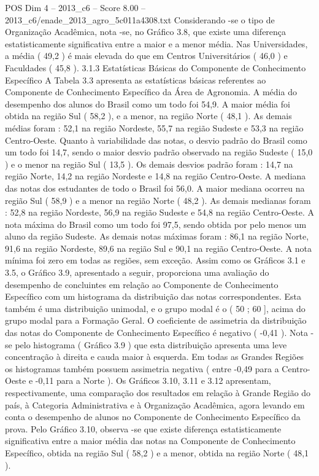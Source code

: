 \begin{textsample}{POS Dim 4 – 2013\_c6 – Score 8.00 – 2013\_c6/enade\_2013\_agro\_5c011a4308.txt}
Considerando -se o tipo de Organização Acadêmica, nota -se, no Gráfico 3.8, que existe uma diferença estatisticamente significativa entre a maior e a menor média.
Nas Universidades, a média ( 49,2 ) é mais elevada do que em Centros Universitários ( 46,0 ) e Faculdades ( 45,8 ). 3.1.3 Estatísticas Básicas do Componente de Conhecimento Específico A Tabela 3.3 apresenta as estatísticas básicas referentes ao Componente de Conhecimento Específico da Área de Agronomia.
A média do desempenho dos alunos do Brasil como um todo foi 54,9.
A maior média foi obtida na região Sul ( 58,2 ), e a menor, na região Norte ( 48,1 ).
As demais médias foram : 52,1 na região Nordeste, 55,7 na região Sudeste e 53,3 na região Centro-Oeste.
Quanto à variabilidade das notas, o desvio padrão do Brasil como um todo foi 14,7, sendo o maior desvio padrão observado na região Sudeste ( 15,0 ) e o menor na região Sul ( 13,5 ).
Os demais desvios padrão foram : 14,7 na região Norte, 14,2 na região Nordeste e 14,8 na região Centro-Oeste.
A mediana das notas dos estudantes de todo o Brasil foi 56,0.
A maior mediana ocorreu na região Sul ( 58,9 ) e a menor na região Norte ( 48,2 ).
As demais medianas foram : 52,8 na região Nordeste, 56,9 na região Sudeste e 54,8 na região Centro-Oeste.
A nota máxima do Brasil como um todo foi 97,5, sendo obtida por pelo menos um aluno da região Sudeste.
As demais notas máximas foram : 86,1 na região Norte, 91,6 na região Nordeste, 89,6 na região Sul e 90,1 na região Centro-Oeste.
A nota mínima foi zero em todas as regiões, sem exceção.
Assim como os Gráficos 3.1 e 3.5, o Gráfico 3.9, apresentado a seguir, proporciona uma avaliação do desempenho de concluintes em relação ao Componente de Conhecimento Específico com um histograma da distribuição das notas correspondentes.
Esta também é uma distribuição unimodal, e o grupo modal é o ( 50 ; 60 ], acima do grupo modal para a Formação Geral.
O coeficiente de assimetria da distribuição das notas do Componente de Conhecimento Específico é negativo ( -0,41 ).
Nota -se pelo histograma ( Gráfico 3.9 ) que esta distribuição apresenta uma leve concentração à direita e cauda maior à esquerda.
Em todas as Grandes Regiões os histogramas também possuem assimetria negativa ( entre -0,49 para a Centro-Oeste e -0,11 para a Norte ).
Os Gráficos 3.10, 3.11 e 3.12 apresentam, respectivamente, uma comparação dos resultados em relação à Grande Região do país, à Categoria Administrativa e à Organização Acadêmica, agora levando em conta o desempenho de alunos no Componente de Conhecimento Específico da prova.
Pelo Gráfico 3.10, observa -se que existe diferença estatisticamente significativa entre a maior média das notas na Componente de Conhecimento Específico, obtida na região Sul ( 58,2 ) e a menor, obtida na região Norte ( 48,1 ).

\end{textsample}
